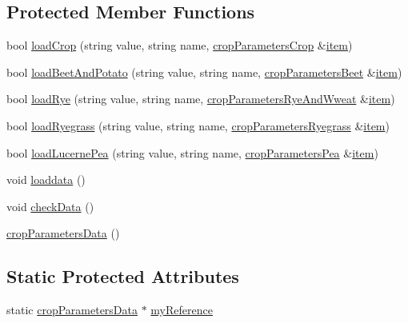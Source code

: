 \subsection*{Protected Member Functions}
\begin{DoxyCompactItemize}
\item 
bool \hyperlink{classcrop_parameters_data_a3054f915f09e2911f88d396dd5b25ac6}{loadCrop} (string value, string name, \hyperlink{classcrop_parameters_crop}{cropParametersCrop} \&\hyperlink{classitem}{item})
\item 
bool \hyperlink{classcrop_parameters_data_a3cc0a5921d5184ba7913d1569dc28dcc}{loadBeetAndPotato} (string value, string name, \hyperlink{classcrop_parameters_beet}{cropParametersBeet} \&\hyperlink{classitem}{item})
\item 
bool \hyperlink{classcrop_parameters_data_a7b60e3ff4fc1a29f1474a50abc1e79f2}{loadRye} (string value, string name, \hyperlink{classcrop_parameters_rye_and_wweat}{cropParametersRyeAndWweat} \&\hyperlink{classitem}{item})
\item 
bool \hyperlink{classcrop_parameters_data_a71647e2d359844346d6b8539e7e1fd5d}{loadRyegrass} (string value, string name, \hyperlink{classcrop_parameters_ryegrass}{cropParametersRyegrass} \&\hyperlink{classitem}{item})
\item 
bool \hyperlink{classcrop_parameters_data_a1d241b4868952e5f6f9b7f2e1f73a520}{loadLucernePea} (string value, string name, \hyperlink{classcrop_parameters_pea}{cropParametersPea} \&\hyperlink{classitem}{item})
\item 
void \hyperlink{classcrop_parameters_data_aa489bba3aa8fc77a3819276b1abbe409}{loaddata} ()
\item 
void \hyperlink{classcrop_parameters_data_abb7dc6734952ed17bc075cc4b18b3c09}{checkData} ()
\item 
\hyperlink{classcrop_parameters_data_a883a119f0a6e013cb03fce35a670675e}{cropParametersData} ()
\end{DoxyCompactItemize}
\subsection*{Static Protected Attributes}
\begin{DoxyCompactItemize}
\item 
static \hyperlink{classcrop_parameters_data}{cropParametersData} $\ast$ \hyperlink{classcrop_parameters_data_a43dc6c0c0c052b85f6e311b39224ede3}{myReference}
\end{DoxyCompactItemize}


